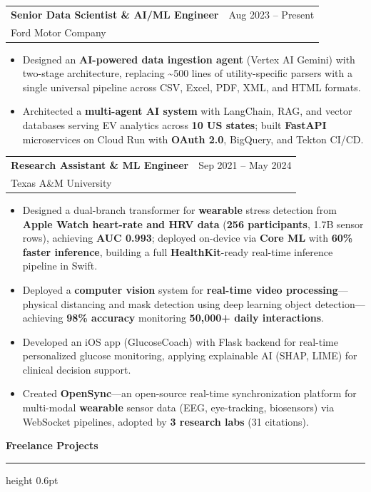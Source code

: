\documentclass[10.5pt,letterpaper]{article}
\makeatletter
\newcommand{\cvsection}[1]{%
  \vspace{0.2em}%
  {\color{headerblue}\large\bfseries #1}%
  \vspace{0.08em}%
  {\color{goldaccent}\hrule height 0.6pt}%
  \vspace{0.2em}%
}
\newcommand{\cventry}[5]{%
  \noindent\begin{tabularx}{\textwidth}{@{}X r@{}}
    {\bfseries\color{headerblue}#2} & {\color{graytext}#1} \\
    {\color{accentcolor}#3}\enskip{\color{lightgray}#4} & \\
  \end{tabularx}%
  \vspace{0.02em}%
  #5%
  \vspace{0.15em}%
}
\makeatother
\begin{document}
\cventry{Aug 2023 -- Present}{Senior Data Scientist \& AI/ML Engineer}{Ford Motor Company}{Detroit, MI}{
\begin{itemize}[leftmargin=0.4cm, itemsep=0.02cm, topsep=0.05cm, label={\color{goldaccent}\textbullet}]
  \item Designed an \textbf{AI-powered data ingestion agent} (Vertex AI Gemini) with two-stage architecture, replacing \textasciitilde500 lines of utility-specific parsers with a single universal pipeline across CSV, Excel, PDF, XML, and HTML formats.
  \item Architected a \textbf{multi-agent AI system} with LangChain, RAG, and vector databases serving EV analytics across \textbf{10 US states}; built \textbf{FastAPI} microservices on Cloud Run with \textbf{OAuth 2.0}, BigQuery, and Tekton CI/CD.
\end{itemize}
}

\cventry{Sep 2021 -- May 2024}{Research Assistant \& ML Engineer}{Texas A\&M University}{College Station, TX}{
\begin{itemize}[leftmargin=0.4cm, itemsep=0.02cm, topsep=0.05cm, label={\color{goldaccent}\textbullet}]
  \item Designed a dual-branch transformer for \textbf{wearable} stress detection from \textbf{Apple Watch heart-rate and HRV data} (\textbf{256 participants}, 1.7B sensor rows), achieving \textbf{AUC 0.993}; deployed on-device via \textbf{Core ML} with \textbf{60\% faster inference}, building a full \textbf{HealthKit}-ready real-time inference pipeline in Swift.
  \item Deployed a \textbf{computer vision} system for \textbf{real-time video processing}---physical distancing and mask detection using deep learning object detection---achieving \textbf{98\% accuracy} monitoring \textbf{50,000+ daily interactions}.
  \item Developed an iOS app (GlucoseCoach) with Flask backend for real-time personalized glucose monitoring, applying explainable AI (SHAP, LIME) for clinical decision support.
  \item Created \textbf{OpenSync}---an open-source real-time synchronization platform for multi-modal \textbf{wearable} sensor data (EEG, eye-tracking, biosensors) via WebSocket pipelines, adopted by \textbf{3 research labs} (31 citations).
\end{itemize}
}

\cvsection{Freelance Projects}
\end{document}

